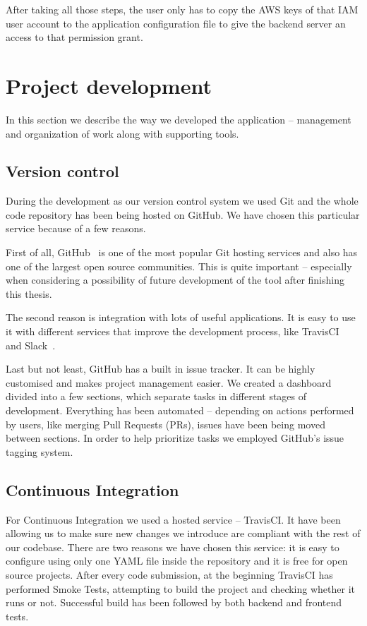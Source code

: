 \documentclass[licencjacka,en]{thesisclass}
\begin{document}
    After taking all those steps, the user only has to copy
    the AWS keys of that IAM user account
    to the application configuration file to give the backend server
    an access to that permission grant.

    \chapter{Project development}

    In this section we describe the way we developed
    the application -- management and organization of work along with supporting tools.

    \section{Version control}

    During the development as our version control system we used Git
    and the whole code repository has been being hosted on GitHub.
    We have chosen this particular service because of a few reasons.

    First of all, GitHub~\cite{GitHub} is one of the most popular Git hosting services
    and also has one of the largest open source communities.
    This is quite important -- especially when considering a possibility of
    future development of the tool after finishing this thesis.

    The second reason is integration with lots of useful applications.
    It is easy to use it with different services that improve the development
    process, like TravisCI~\cite{TravisCI} and Slack~\cite{Slack}.

    Last but not least, GitHub has a built in issue tracker.
    It can be highly customised and makes project management easier.
    We created a dashboard divided into a few sections, which separate tasks
    in different stages of development.
    Everything has been automated -- depending on actions performed by users,
    like merging Pull Requests (PRs), issues have been being moved between sections.
    In order to help prioritize tasks we employed GitHub's issue tagging system.

    \section{Continuous Integration}

    For Continuous Integration we used a hosted service -- TravisCI.
    It have been allowing us to make sure new changes we introduce
    are compliant with the rest of our codebase.
    There are two reasons we have chosen this service:
    it is easy to configure using only one YAML file
    inside the repository and it is free for open source projects.
    After every code submission, at the beginning TravisCI
    has performed Smoke Tests, attempting to build the project
    and checking whether it runs or not.
    Successful build has been followed by both backend and frontend tests.
\end{document}
